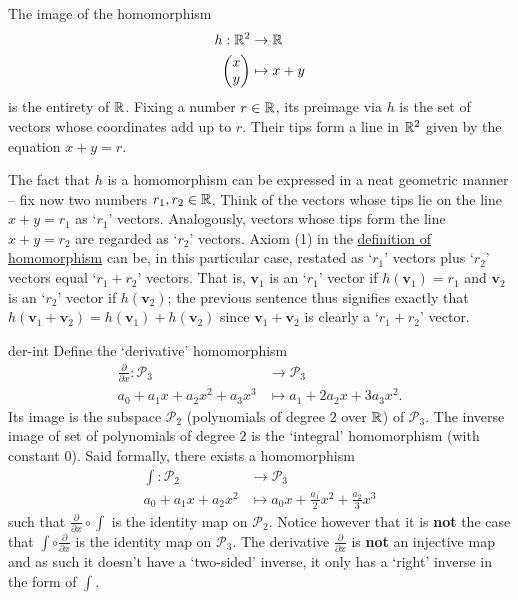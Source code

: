 \begin{example}{}{}
 The image of the homomorphism
 \begin{align*}
  h: \mathbb{R}^2 &\to \mathbb{R}\\
  \begin{pmatrix}
   x\\
   y
  \end{pmatrix}
          & \mapsto 
          x + y
 \end{align*}
 is the entirety of $\mathbb{R}$. Fixing a number $r \in \mathbb{R}$, its preimage via $h$ is
 the set of vectors whose coordinates add up to $r$. Their tips form a line in
 $\mathbb{R}^2$ given by the equation $x + y = r$.

 The fact that $h$ is a homomorphism can be expressed in a neat geometric manner
 -- fix now two numbers $r_1,r_2 \in \mathbb{R}$. Think of the vectors whose tips lie on
 the line $x + y = r_1$ as `$r_1$' vectors. Analogously, vectors whose tips form
 the line $x + y = r_2$ are regarded as `$r_2$' vectors. Axiom (1) in the
 \hyperref[def:homomorphism]{definition of homomorphism} can be, in this
 particular case, restated as `$r_1$' vectors plus `$r_2$' vectors equal `$r_1 +
 r_2$' vectors. That is, $\mathbf{v}_1$ is an `$r_1$' vector if $h(\mathbf{v}_1)
 = r_1$ and $\mathbf{v}_2$ is an `$r_2$' vector if $h(\mathbf{v}_2)$; the
 previous sentence thus signifies exactly that $h(\mathbf{v}_1 + \mathbf{v}_2) =
 h(\mathbf{v}_1) + h(\mathbf{v}_2)$ since $\mathbf{v}_1 + \mathbf{v}_2$ is
 clearly a `$r_1 + r_2$' vector.
 \begin{center}
 \end{center}
\end{example}

\begin{example}{}{der-int}
 Define the `derivative' homomorphism
 \begin{align*}
  \frac{\partial }{\partial x}: \mathcal{P}_3 &\to \mathcal{P}_3\\
  a_0 + a_1x + a_2x^2 + a_3x^3 & \mapsto a_1 + 2a_2x + 3a_3x^2.
 \end{align*}
 Its image is the subspace $\mathcal{P}_2$ (polynomials of degree $2$ over $\mathbb{R}$)
 of $\mathcal{P}_3$. The inverse image of set of polynomials of degree $2$ is
 the `integral' homomorphism (with constant $0$). Said formally, there exists a
 homomorphism
 \begin{align*}
  \int: \mathcal{P}_2 & \to \mathcal{P}_3\\
  a_0 + a_1x + a_2x^2 & \mapsto a_0x + \frac{a_1}{2}x^2 + \frac{a_2}{3}x^3
 \end{align*}
 such that $\frac{\partial }{\partial x} \circ \int $ is the identity map on
 $\mathcal{P}_2$. Notice however that it is \textbf{not} the case that $\int
 \circ \frac{\partial }{\partial x}$ is the identity map on $\mathcal{P}_3$. The
 derivative $\frac{\partial }{\partial x}$ is \textbf{not} an injective map and
 as such it doesn't have a `two-sided' inverse, it only has a `right' inverse in
 the form of $\int $.
\end{example}

